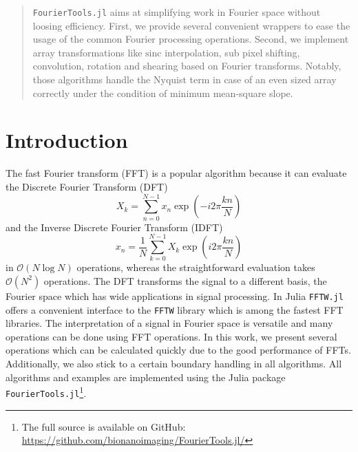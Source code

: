 \documentclass{juliacon}
\def\sinc{\mathrm{sinc}}
\begin{document}


\maketitle

\begin{abstract}
\verb|FourierTools.jl| aims at simplifying work in Fourier
space without loosing efficiency.
First, we provide several convenient wrappers to ease the usage of the common Fourier processing operations.
Second, we implement array transformations like $\sinc$ interpolation, sub pixel shifting, convolution, rotation and shearing based on Fourier transforms.
Notably, those algorithms handle the Nyquist term in case of an even sized array correctly
under the condition of minimum mean-square slope.

\end{abstract}

\section{Introduction}
The fast Fourier transform (FFT) is a popular algorithm because it can evaluate the Discrete Fourier Transform (DFT) 
\begin{equation}
    X_k = \sum_{n=0}^{N-1} x_n \exp\left(-i2 \pi \frac{kn}{N} \right)
    \label{eq:dft}
\end{equation}
and the Inverse Discrete Fourier Transform (IDFT)
\begin{equation}
    x_n = \frac1{N}\sum_{k=0}^{N-1} X_k \exp\left(i2 \pi \frac{kn}{N} \right)
    \label{eq:idft}
\end{equation}
in $\mathcal{O}(N \log N)$ operations, whereas the straightforward
evaluation takes $\mathcal{O}(N^2)$ operations.
The DFT transforms the signal to a different basis, the Fourier space which
has wide applications in signal processing.
In Julia \cite{bezanson2017julia} \verb|FFTW.jl| offers a convenient interface to
the \verb|FFTW| library \cite{FFTW05} which is among the fastest FFT libraries.
The interpretation of a signal in Fourier space is versatile and many operations can
be done using FFT operations. 
In this work, we present several operations which can be calculated quickly 
due to the good performance of FFTs.
Additionally, we also stick to a certain boundary handling in all algorithms.
All algorithms and examples are implemented using the Julia package \verb|FourierTools.jl|\footnote{The full source is available on GitHub: \url{https://github.com/bionanoimaging/FourierTools.jl/}}.
\end{document}
